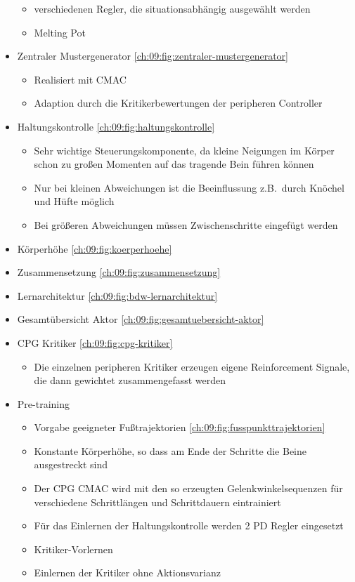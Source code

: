 \begin{itemize}
\begin{itemize}
		\item verschiedenen Regler, die situationsabhängig ausgewählt werden
		\item Melting Pot
	\end{itemize}
	\item Zentraler Mustergenerator \autoref{ch:09:fig:zentraler-mustergenerator}
	\begin{itemize}
		\item Realisiert mit CMAC
		\item Adaption durch die Kritikerbewertungen der peripheren Controller
	\end{itemize}
	\item Haltungskontrolle \autoref{ch:09:fig:haltungskontrolle}
	\begin{itemize}
		\item Sehr wichtige Steuerungskomponente, da kleine Neigungen im Körper schon zu großen Momenten auf das tragende Bein führen können
		\item Nur bei kleinen Abweichungen ist die Beeinflussung z.B.\ durch Knöchel und Hüfte möglich
		\item Bei größeren Abweichungen müssen Zwischenschritte eingefügt werden
	\end{itemize}
	\item Körperhöhe \cref{ch:09:fig:koerperhoehe} %
	\item Zusammensetzung \cref{ch:09:fig:zusammensetzung}
	\item Lernarchitektur \autoref{ch:09:fig:bdw-lernarchitektur}
	\item Gesamtübersicht Aktor \autoref{ch:09:fig:gesamtuebersicht-aktor}
	\item CPG Kritiker \autoref{ch:09:fig:cpg-kritiker}
	\begin{itemize}
		\item Die einzelnen peripheren Kritiker erzeugen eigene Reinforcement Signale, die dann gewichtet zusammengefasst werden
	\end{itemize}
	\item Pre-training
	\begin{itemize}
		\item Vorgabe geeigneter Fußtrajektorien \autoref{ch:09:fig:fusspunkttrajektorien}
		\item Konstante Körperhöhe, so dass am Ende der Schritte die Beine ausgestreckt sind
		\item Der CPG CMAC wird mit den so erzeugten Gelenkwinkelsequenzen für verschiedene Schrittlängen und Schrittdauern eintrainiert
		\item Für das Einlernen der Haltungskontrolle  werden 2 PD Regler eingesetzt
		\item Kritiker-Vorlernen
		\item Einlernen der Kritiker ohne Aktionsvarianz
	\end{itemize}
\end{itemize}

